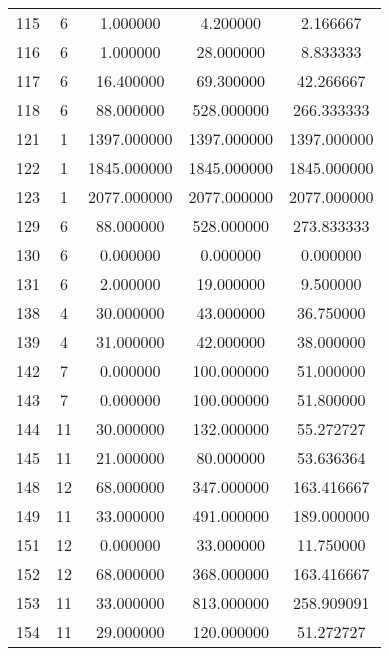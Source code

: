 \documentclass[a4paper,12pt]{article}
\begin{document}
\begin{center}
\begin{longtable}{l S[table-format=3.0] S[table-format=8.2] S[table-format=8.2] S[table-format=8.2]}
        115   &   6   &    1.000000   &      4.200000     &       2.166667 \\
        116   &   6   &    1.000000   &     28.000000     &       8.833333 \\
        117   &   6   &   16.400000   &     69.300000     &      42.266667 \\
        118   &   6   &   88.000000   &    528.000000     &     266.333333 \\
        121   &   1   &  1397.000000   &   1397.000000     &    1397.000000 \\
        122   &   1   &  1845.000000   &   1845.000000     &    1845.000000 \\
        123   &   1   &  2077.000000   &   2077.000000     &    2077.000000 \\
        129   &   6   &   88.000000   &    528.000000     &     273.833333 \\
        130   &   6   &    0.000000   &      0.000000     &       0.000000 \\
        131   &   6   &    2.000000   &     19.000000     &       9.500000 \\
        138   &   4   &   30.000000   &     43.000000     &      36.750000 \\
        139   &   4   &   31.000000   &     42.000000     &      38.000000 \\
        142   &   7   &    0.000000   &    100.000000     &      51.000000 \\
        143   &   7   &    0.000000   &    100.000000     &      51.800000 \\
        144   &  11   &   30.000000   &    132.000000     &      55.272727 \\
        145   &  11   &   21.000000   &     80.000000     &      53.636364 \\
        148   &  12   &   68.000000   &    347.000000     &     163.416667 \\
        149   &  11   &   33.000000   &    491.000000     &     189.000000 \\
         151   &  12   &    0.000000   &     33.000000     &      11.750000 \\
        152   &  12   &   68.000000   &    368.000000     &     163.416667 \\
        153   &  11   &   33.000000   &    813.000000     &     258.909091 \\
        154   &  11   &   29.000000   &    120.000000     &      51.272727 \\

\end{longtable}
\end{center}
\end{document}
